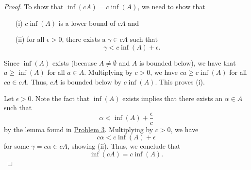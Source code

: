 \documentclass[11pt,a4paper]{article}
\begin{document}
\begin{enumerate}
\begin{enumerate}
\begin{proof}
            To show that \( \inf(cA) = c \inf(A) \), we need to show that 
            \begin{enumerate}
                \item[(i)] \( c \inf(A) \) is a lower bound of \( cA \) and 
                \item[(ii)] for all \( \epsilon > 0  \), there exists a \( \gamma \in cA    \) such that 
                    \[  \gamma < c \inf(A) + \epsilon.  \]
            \end{enumerate}

            Since \( \inf(A) \) exists (because \( A \neq \emptyset  \) and \( A  \) is bounded below), we have that \( a \geq \inf(A)  \) for all \( a \in A  \). Multiplying by \( c > 0  \), we have \( ca \geq c\inf(A)  \) for all \( ca \in cA \). Thus, \( cA  \) is bounded below by \( c \inf(A) \). This proves (i).

            Let \( \epsilon > 0 \). Note the fact that \( \inf(A) \) exists implies that there exists an \( \alpha \in A  \) such that  
            \[   \alpha < \inf(A) + \frac{ \epsilon }{ c } \]
            by the lemma found in {\hyperref[Problem 3]{Problem 3}}. Multiplying by \( c > 0  \), we have 
            \[  c \alpha < c \inf(A) + \epsilon \]
            for some \( \gamma  = c \alpha \in cA  \), showing (ii). Thus, we conclude that   
            \[  \inf(cA) = c \inf(A). \]
            

\end{proof}
\end{enumerate}
\end{enumerate}
\end{document}
